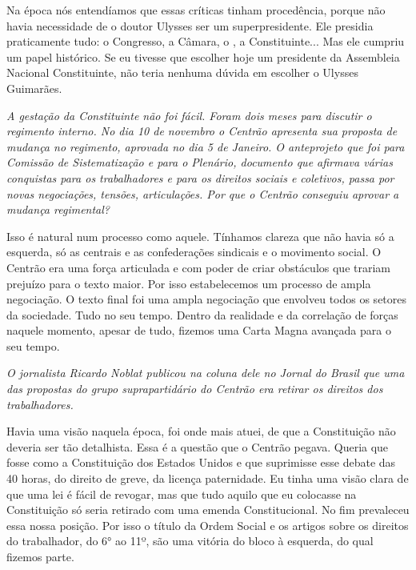 Na época nós entendíamos que essas críticas tinham
procedência, porque não havia necessidade de o doutor Ulysses ser um
superpresidente. Ele presidia praticamente tudo: o Congresso, a Câmara,
o , a Constituinte... Mas ele cumpriu um papel histórico. Se eu
tivesse que escolher hoje um presidente da Assembleia Nacional
Constituinte, não teria nenhuma dúvida em escolher o Ulysses Guimarães.

\medskip

\noindent\emph{A gestação da Constituinte não foi fácil. Foram dois meses para
discutir o regimento interno. No dia 10 de novembro o Centrão apresenta
sua proposta de mudança no regimento, aprovada no dia 5 de Janeiro. O
anteprojeto que foi para Comissão de Sistematização e para o Plenário,
documento que afirmava várias conquistas para os trabalhadores e para os
direitos sociais e coletivos, passa por novas negociações, tensões,
articulações. Por que o Centrão conseguiu aprovar a mudança regimental?}

Isso é natural num processo como aquele. Tínhamos clareza
que não havia só a esquerda, só as centrais e as confederações sindicais
e o movimento social. O Centrão era uma força articulada e com poder de
criar obstáculos que trariam prejuízo para o texto maior. Por isso
estabelecemos um processo de ampla negociação. O texto final foi uma
ampla negociação que envolveu todos os setores da sociedade. Tudo no seu
tempo. Dentro da realidade e da correlação de forças naquele momento,
apesar de tudo, fizemos uma Carta Magna avançada para o seu tempo.

\medskip

\noindent\emph{O jornalista Ricardo Noblat publicou na coluna dele no Jornal do
Brasil que uma das propostas do grupo suprapartidário do Centrão era
retirar os direitos dos trabalhadores.}

Havia uma visão naquela época, foi onde mais atuei, de
que a Constituição não deveria ser tão detalhista. Essa é a questão que
o Centrão pegava. Queria que fosse como a Constituição dos Estados
Unidos e que suprimisse esse debate das 40 horas, do direito de greve,
da licença paternidade. Eu tinha uma visão clara de que uma lei é fácil
de revogar, mas que tudo aquilo que eu colocasse na Constituição só
seria retirado com uma emenda Constitucional. No fim prevaleceu essa
nossa posição. Por isso o título da Ordem Social e os artigos sobre os
direitos do trabalhador, do 6° ao 11º, são uma vitória do bloco à
esquerda, do qual fizemos parte.

\medskip


